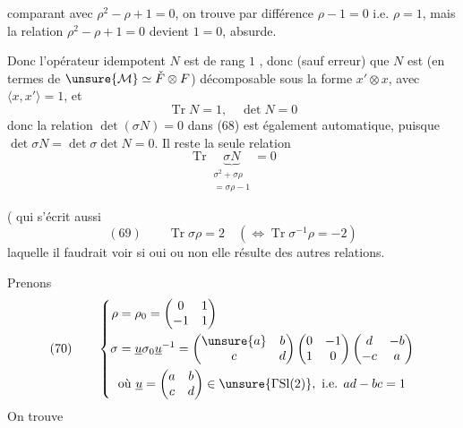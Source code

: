 comparant avec $\rho^2-\rho+1=0$, on trouve  par différence $\rho-1=0$ i.e. $\rho=1$, mais la relation $\rho^2-\rho+1=0$ devient $1=0$, absurde.

Donc l'opérateur idempotent $N$ est  de rang $1$ , donc  (sauf erreur)  que $N$ est  (en termes de $\unsure{\mathcal M}\simeq\check F\otimes F$)  décomposable sous la forme $x'\otimes x$, avec $\langle x,x'\rangle=1$, et 
\[
\operatorname{Tr}N=1,\quad\det N=0
\]
donc la relation $\det(\sigma N)=0$ dans (68) est également automatique, puisque $\det\sigma N=\det\sigma\det N=0$. Il reste la seule relation
\[
\operatorname{Tr}\underbrace{\sigma N}_{\substack{\sigma^2+\sigma\rho\\=\sigma\rho-1}}=0
\]

(  qui s'écrit aussi
\[
(69)\qquad \operatorname{Tr}\sigma\rho=2\quad(\Longleftrightarrow\operatorname{Tr}\sigma^{-1}\rho=-2)
\]
 laquelle il faudrait voir si oui ou non elle résulte des autres relations.

Prenons
\[
(70)\qquad
\left\{\begin{aligned}
\rho&=\rho_0=\begin{pmatrix}0&1\\-1&1\end{pmatrix}\\
\sigma&=\underline u\sigma_0\underline u^{-1}
=\begin{pmatrix}\unsure{a}&b\\c&d\end{pmatrix}
\begin{pmatrix}0&-1\\1&0\end{pmatrix}
\begin{pmatrix}d&-b\\-c&a\end{pmatrix}\\
&\text{où }\underline u=\begin{pmatrix}a&b\\c&d\end{pmatrix}\in\unsure{\Gamma\mathrm{Sl}(2)},\text{ i.e. }ad-bc=1
\end{aligned}\right.
\]
On trouve


